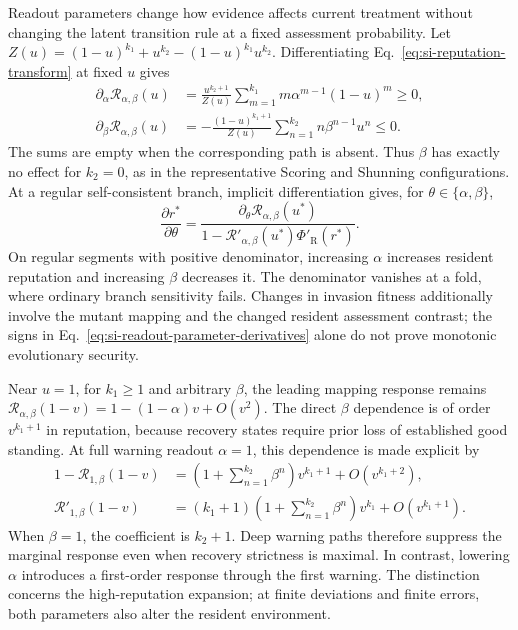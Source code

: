 \documentclass[fleqn,10pt]{wlscirep}
\begin{document}
Readout parameters change how evidence affects current treatment without changing the latent transition rule at a fixed assessment probability. Let
$Z(u)=(1-u)^{k_1}+u^{k_2}-(1-u)^{k_1}u^{k_2}$.
Differentiating Eq.~\eqref{eq:si-reputation-transform} at fixed $u$ gives
\begin{equation}
\begin{aligned}
\partial_\alpha\mathcal R_{\alpha,\beta}(u)
&=\frac{u^{k_2+1}}{Z(u)}
\sum_{m=1}^{k_1}m\alpha^{m-1}(1-u)^m\geq0,\\
\partial_\beta\mathcal R_{\alpha,\beta}(u)
&=-\frac{(1-u)^{k_1+1}}{Z(u)}
\sum_{n=1}^{k_2}n\beta^{n-1}u^n\leq0.
\end{aligned}
\label{eq:si-readout-parameter-derivatives}
\end{equation}
The sums are empty when the corresponding path is absent. Thus $\beta$ has exactly no effect for $k_2=0$, as in the representative Scoring and Shunning configurations. At a regular self-consistent branch, implicit differentiation gives, for $\theta\in\{\alpha,\beta\}$,
\begin{equation}
\frac{\partial r^*}{\partial\theta}
=\frac{\partial_\theta\mathcal R_{\alpha,\beta}(u^*)}
{1-\mathcal R'_{\alpha,\beta}(u^*)\Phi'_{\mathrm R}(r^*)}.
\label{eq:si-readout-branch-sensitivity}
\end{equation}
On regular segments with positive denominator, increasing $\alpha$ increases resident reputation and increasing $\beta$ decreases it. The denominator vanishes at a fold, where ordinary branch sensitivity fails. Changes in invasion fitness additionally involve the mutant mapping and the changed resident assessment contrast; the signs in Eq.~\eqref{eq:si-readout-parameter-derivatives} alone do not prove monotonic evolutionary security.

Near $u=1$, for $k_1\geq1$ and arbitrary $\beta$, the leading mapping response remains $\mathcal R_{\alpha,\beta}(1-v)=1-(1-\alpha)v+O(v^2)$. The direct $\beta$ dependence is of order $v^{k_1+1}$ in reputation, because recovery states require prior loss of established good standing. At full warning readout $\alpha=1$, this dependence is made explicit by
\begin{equation}
\begin{aligned}
1-\mathcal R_{1,\beta}(1-v)
&=\left(1+\sum_{n=1}^{k_2}\beta^n\right)v^{k_1+1}
+O(v^{k_1+2}),\\
\mathcal R'_{1,\beta}(1-v)
&=(k_1+1)\left(1+\sum_{n=1}^{k_2}\beta^n\right)v^{k_1}
+O(v^{k_1+1}).
\end{aligned}
\label{eq:si-readout-beta-asymptotic}
\end{equation}
When $\beta=1$, the coefficient is $k_2+1$. Deep warning paths therefore suppress the marginal response even when recovery strictness is maximal. In contrast, lowering $\alpha$ introduces a first-order response through the first warning. The distinction concerns the high-reputation expansion; at finite deviations and finite errors, both parameters also alter the resident environment.
\end{document}
